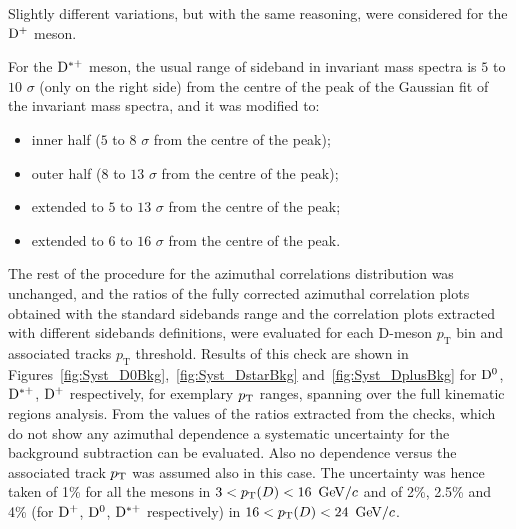 Slightly different variations, but with the same reasoning, were considered for the ${\rm D^+}$ meson.

For the ${\rm D^{*+}}$ meson, the usual range of sideband in invariant mass spectra is $5$ to $10$ $\sigma$ (only on the right side) from the centre of the peak of the Gaussian fit of the invariant mass spectra,  and it was modified to:
\begin{itemize}
    \item inner half ($5$ to $8$ $\sigma$ from the centre of the peak);
    \item outer half ($8$ to $13$ $\sigma$ from the centre of the peak);
    \item extended to $5$ to $13$ $\sigma$ from the centre of the peak;
     \item extended to $6$ to $16$ $\sigma$ from the centre of the peak.
\end{itemize}

The rest of the procedure for the azimuthal correlations distribution was unchanged, and the ratios of the fully corrected azimuthal correlation plots obtained with the standard sidebands range and the correlation plots extracted with different sidebands definitions, were evaluated for each D-meson $p_\text{T}$ bin and associated tracks $p_\text{T}$ threshold. Results of this check are shown in Figures~\ref{fig:Syst_D0Bkg},~\ref{fig:Syst_DstarBkg} and~\ref{fig:Syst_DplusBkg} for ${\rm D^0}$, ${\rm D^{*+}}$, ${\rm D^+}$ respectively, for exemplary $p_{\rm T}$ ranges, spanning over the full kinematic regions analysis. From the values of the ratios extracted from the checks, which do not show any azimuthal dependence a systematic uncertainty for the background subtraction can be evaluated. Also no dependence versus the associated track $p_{\rm T}$ was assumed also in this case. The uncertainty was hence taken of 1\% for all the mesons in $3 < p_{\rm T}(D) < 16$ $\mathrm{GeV}/c$ and of 2\%, 2.5\% and 4\% (for ${\rm D^+}$, ${\rm D^0}$, ${\rm D^{*+}}$ respectively) in $16 < p_{\rm T}(D) < 24$ $\mathrm{GeV}/c$.


